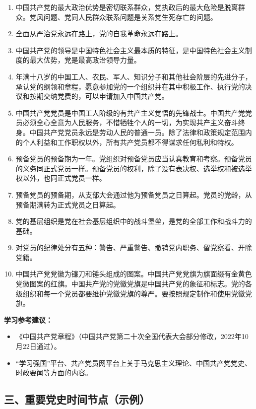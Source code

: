 \documentclass[UTF8,11pt,a4paper]{ctexart}
\begin{document}
\begin{enumerate}[label=\arabic*., leftmargin=2.3em]
\item 中国共产党的最大政治优势是密切联系群众，党执政后的最大危险是脱离群众。党风问题、党同人民群众联系问题是关系党生死存亡的问题。
\item 全面从严治党永远在路上，党的自我革命永远在路上。
\item 中国共产党的领导是中国特色社会主义最本质的特征，是中国特色社会主义制度的最大优势，党是最高政治领导力量。
\item 年满十八岁的中国工人、农民、军人、知识分子和其他社会阶层的先进分子，承认党的纲领和章程，愿意参加党的一个组织并在其中积极工作、执行党的决议和按期交纳党费的，可以申请加入中国共产党。
\item 中国共产党党员是中国工人阶级的有共产主义觉悟的先锋战士。中国共产党党员必须全心全意为人民服务，不惜牺牲个人的一切，为实现共产主义奋斗终身。中国共产党党员永远是劳动人民的普通一员。除了法律和政策规定范围内的个人利益和工作职权以外，所有共产党员都不得谋求任何私利和特权。
\item 预备党员的预备期为一年。党组织对预备党员应当认真教育和考察。预备党员的义务同正式党员一样。预备党员的权利，除了没有表决权、选举权和被选举权以外，也同正式党员一样。
\item 预备党员的预备期，从支部大会通过他为预备党员之日算起。党员的党龄，从预备期满转为正式党员之日算起。
\item 党的基层组织是党在社会基层组织中的战斗堡垒，是党的全部工作和战斗力的基础。
\item 对党员的纪律处分有五种：警告、严重警告、撤销党内职务、留党察看、开除党籍。
\item 中国共产党党徽为镰刀和锤头组成的图案。中国共产党党旗为旗面缀有金黄色党徽图案的红旗。中国共产党的党徽党旗是中国共产党的象征和标志。党的各级组织和每一个党员都要维护党徽党旗的尊严。要按照规定制作和使用党徽党旗。
\end{enumerate}

\noindent\textbf{学习参考建议：}
\begin{itemize}[leftmargin=2em,label={}]
\item 《中国共产党章程》（中国共产党第二十次全国代表大会部分修改，2022年10月22日通过）。
\item “学习强国”平台、共产党员网平台上关于马克思主义理论、中国共产党党史、时政要闻等方面的内容。
\end{itemize}

\subsection*{三、重要党史时间节点（示例）}
\end{document}
